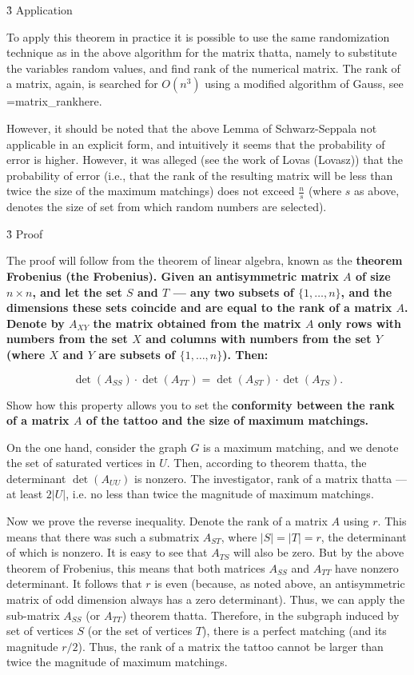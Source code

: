 \h3{ Application }

To apply this theorem in practice it is possible to use the same randomization technique as in the above algorithm for the matrix thatta, namely to substitute the variables random values, and find rank of the numerical matrix. The rank of a matrix, again, is searched for $O (n^3)$ using a modified algorithm of Gauss, see \algohref=matrix_rank{here}.

However, it should be noted that the above Lemma of Schwarz-Seppala not applicable in an explicit form, and intuitively it seems that the probability of error is higher. However, it was alleged (see the work of Lovas (Lovasz)) that the probability of error (i.e., that the rank of the resulting matrix will be less than twice the size of the maximum matchings) does not exceed $\frac{n}{s}$ (where $s$ as above, denotes the size of set from which random numbers are selected).


\h3{ Proof }

The proof will follow from the theorem of linear algebra, known as the \bf{theorem Frobenius} (the Frobenius). Given an antisymmetric matrix $A$ of size $n \times n$, and let the set $S$ and $T$ --- any two subsets of $\{ 1, \ldots, n \}$, and the dimensions these sets coincide and are equal to the rank of a matrix $A$. Denote by $A_{XY}$ the matrix obtained from the matrix $A$ only rows with numbers from the set $X$ and columns with numbers from the set $Y$ (where $X$ and $Y$ are subsets of $\{ 1, \ldots, n \}$). Then:

$$ \det(A_{SS}) \cdot \det(A_{TT}) = \det(A_{ST}) \cdot \det(A_{TS}). $$

Show how this property allows you to set the \bf{conformity} between the rank of a matrix $A$ of the tattoo and the size of maximum matchings.

On the one hand, consider the graph $G$ is a maximum matching, and we denote the set of saturated vertices in $U$. Then, according to theorem thatta, the determinant $\det(A_{UU})$ is nonzero. The investigator, rank of a matrix thatta --- at least $2|U|$, i.e. no less than twice the magnitude of maximum matchings.

Now we prove the reverse inequality. Denote the rank of a matrix $A$ using $r$. This means that there was such a submatrix $A_{ST}$, where $|S| = |T| = r$, the determinant of which is nonzero. It is easy to see that $A_{TS}$ will also be zero. But by the above theorem of Frobenius, this means that both matrices $A_{SS}$ and $A_{TT}$ have nonzero determinant. It follows that $r$ is even (because, as noted above, an antisymmetric matrix of odd dimension always has a zero determinant). Thus, we can apply the sub-matrix $A_{SS}$ (or $A_{TT}$) theorem thatta. Therefore, in the subgraph induced by set of vertices $S$ (or the set of vertices $T$), there is a perfect matching (and its magnitude $r/2$). Thus, the rank of a matrix the tattoo cannot be larger than twice the magnitude of maximum matchings.

